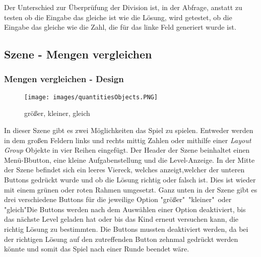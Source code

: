 Der Unterschied zur Überprüfung der Division ist, in der Abfrage, anstatt zu testen ob die Eingabe das gleiche ist wie die Lösung, wird getestet, ob die Eingabe das gleiche wie die Zahl, die für das linke Feld generiert wurde ist.
\subsection{Szene - Mengen vergleichen}
\subsubsection{Mengen vergleichen - Design}
\begin{figure}[htbp]
  \centering
  \texttt{[image: images/quantitiesObjects.PNG]}
  \caption{größer, kleiner, gleich}
  \label{quantities}
\end{figure}
In dieser Szene gibt es zwei Möglichkeiten das Spiel zu spielen. Entweder werden in dem großen Feldern links und rechts mittig Zahlen oder mithilfe einer \textit{Layout Group} Objekte in vier Reihen eingefügt. Der Header der Szene beinhaltet einen Menü-Bbutton, eine kleine Aufgabenstellung und die Level-Anzeige. In der Mitte der Szene befindet sich ein leeres Viereck, welches anzeigt,welcher der unteren Buttons gedrückt wurde und ob die Lösung richtig oder falsch ist. Dies ist wieder mit einem grünen oder roten Rahmen umgesetzt. Ganz unten in der Szene gibt es drei verschiedene Buttons für die jeweilige Option "größer"\, "kleiner"\ oder "gleich"\. Die Buttons werden nach dem Auswählen einer Option deaktiviert, bis das nächste Level geladen hat oder bis das Kind erneut versuchen kann, die richtig Lösung zu bestimmten. Die Buttons mussten deaktiviert werden, da bei der richtigen Lösung auf den zutreffenden Button zehnmal gedrückt werden könnte und somit das Spiel nach einer Runde beendet wäre.\\
